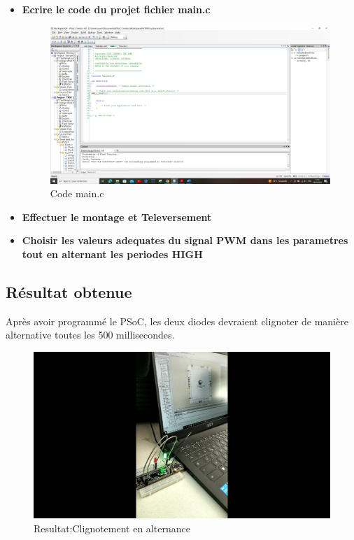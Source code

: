 \begin{itemize}
\begin{figure}[htp]
      \end{figure}
    \item \textbf{Ecrire le code du projet fichier main.c}
    \begin{figure}[htp]
        \centering
        \includegraphics[width=15cm]{images/codetwo.png }
        \caption{Code main.c }
        \label{fig:example8}
      \end{figure}
    \item \textbf{Effectuer le montage et Televersement }
    \item \textbf{Choisir les valeurs adequates du signal PWM dans les parametres tout en alternant les periodes HIGH} 
\end{itemize}
\subsection{Résultat obtenue}
\label{sec:Résultat obtenue}
Après avoir programmé le PSoC, les deux diodes devraient 
clignoter de manière alternative toutes les 500 millisecondes.
\begin{figure}[htp]
    \centering
    \includegraphics[width=15cm]{images/alternance.png }
    \caption{ Resultat:Clignotement en alternance}
    \label{fig:example9}
  \end{figure}

